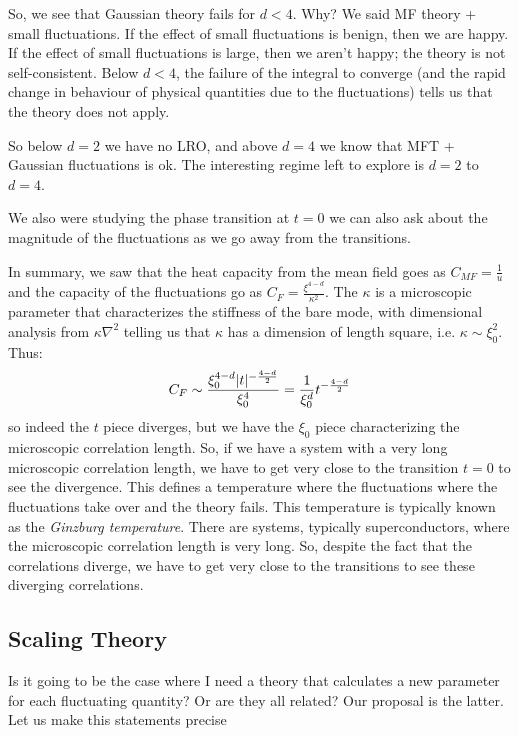 So, we see that Gaussian theory fails for $d < 4$. Why? We said MF theory + small fluctuations. If the effect of small fluctuations is benign, then we are happy. If the effect of small fluctuations is large, then we aren't happy; the theory is not self-consistent. Below $d < 4$, the failure of the integral to converge (and the rapid change in behaviour of physical quantities due to the fluctuations) tells us that the theory does not apply.

So below $d = 2$ we have no LRO, and above $d = 4$ we know that MFT + Gaussian fluctuations is ok. The interesting regime left to explore is $d = 2$ to $d = 4$. 

We also were studying the phase transition at $t = 0$ we can also ask about the magnitude of the fluctuations as we go away from the transitions.

In summary, we saw that the heat capacity from the mean field goes as $C_{MF} = \frac{1}{u}$ and the capacity of the fluctuations go as $C_{F} = \frac{\xi^{4-d}}{\kappa^2}$. The $\kappa$ is a microscopic parameter that characterizes the stiffness of the bare mode, with dimensional analysis from $\kappa \nabla^2$ telling us that $\kappa$ has a dimension of length square, i.e. $\kappa \sim \xi_0^{2}$. Thus:
\begin{equation}
    C_F \sim \frac{\xi_0^{4-d}\lvert t \rvert^{-\frac{4-d}{2}}}{\xi_0^4} = \frac{1}{\xi_0^d}t^{-\frac{4-d}{2}}
\end{equation}
so indeed the $t$ piece diverges, but we have the $\xi_0$ piece characterizing the microscopic correlation length. So, if we have a system with a very long microscopic correlation length, we have to get very close to the transition $t = 0$ to see the divergence. This defines a temperature where the fluctuations where the fluctuations take over and the theory fails. This temperature is typically known as the \emph{Ginzburg temperature}. There are systems, typically superconductors, where the microscopic correlation length is very long. So, despite the fact that the correlations diverge, we have to get very close to the transitions to see these diverging correlations.

\subsection{Scaling Theory}
Is it going to be the case where I need a theory that calculates a new parameter for each fluctuating quantity? Or are they all related? Our proposal is the latter. Let us make this statements precise

